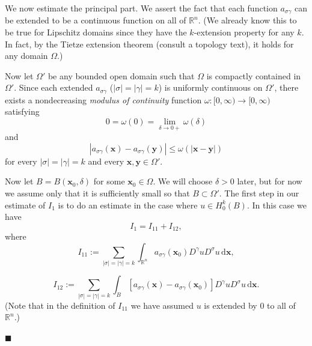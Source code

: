 \begingroup
\renewenvironment{Proof}{\par}{\par\nobreak\hfill$\blacksquare$\par\vspace{0.1cm}}
\begin{Proof}
We now estimate the principal part. We assert the fact that each function $a_{\sigma\gamma}$ can be extended to be a continuous function on all of $\mathbb{R}^n$. (We already know this to be true for Lipschitz domains since they have the $k$-extension property for any $k$. In fact, by the Tietze extension theorem (consult a topology text), it holds for any domain $\Omega$.)

Now let $\Omega\prime$ be any bounded open domain such that $\Omega$ is compactly contained in $\Omega\prime$. Since each extended $a_{\sigma\gamma}$ ($|\sigma|=|\gamma|=k$) is uniformly continuous on $\Omega\prime$, there exists a nondecreasing \emph{modulus of continuity} function $\omega:[0,\infty)\to[0,\infty)$ satisfying
\begin{equation}\label{eq:garding-common-continuity-modulus-at-zero}
0=\omega(0)=\lim_{\delta\to0+}\omega(\delta)
\end{equation}
and
\begin{equation}\label{eq:garding-common-coefficient-continuity-modulus}
|a_{\sigma\gamma}(\bm{x})-a_{\sigma\gamma}(\bm{y})|\leq\omega(|\bm{x}-\bm{y}|)
\end{equation}
for every $|\sigma|=|\gamma|=k$ and every $\bm{x},\bm{y}\in\Omega\prime$.

Now let $B=B(\bm{x}_0,\delta)$ for some $\bm{x}_0\in\Omega$. We will choose $\delta>0$ later, but for now we assume only that it is sufficiently small so that $B\subset\Omega\prime$. The first step in our estimate of $I_1$ is to do an estimate in the case where $u\in H_0^k(B)$. In this case we have
\begin{equation}\label{eq:garding-frozen-principal-coefficient-splitting}
I_1=I_{11}+I_{12},
\end{equation}
where
\begin{equation}\label{eq:garding-frozen-principal-part}
I_{11}:=\sum_{|\sigma|=|\gamma|=k}\int_{\mathbb{R}^n}a_{\sigma\gamma}(\bm{x}_0)D^\gamma uD^\sigma u\,\mathrm{d}\bm{x},
\end{equation}

\begin{equation}\label{eq:garding-coefficient-variation-part}
I_{12}:=\sum_{|\sigma|=|\gamma|=k}\int_B[a_{\sigma\gamma}(\bm{x})-a_{\sigma\gamma}(\bm{x}_0)]D^\gamma uD^\sigma u\,\mathrm{d}\bm{x}.
\end{equation}
(Note that in the definition of $I_{11}$ we have assumed $u$ is extended by $0$ to all of $\mathbb{R}^n$.)


\end{Proof}
